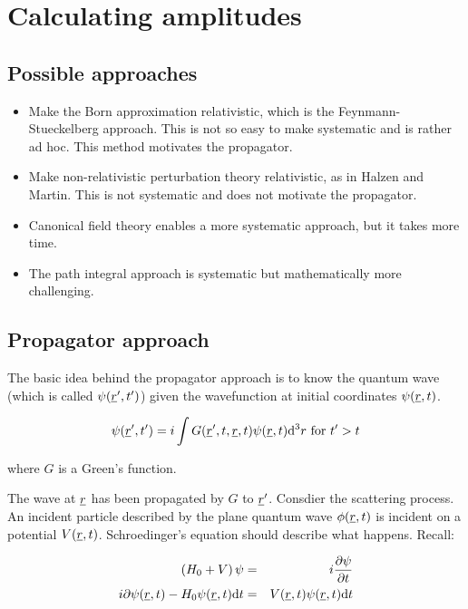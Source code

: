 \chapter{Calculating amplitudes}

\section{Possible approaches}

\begin{itemize}
  \item Make the Born approximation relativistic, which is the Feynmann-Stueckelberg approach.  This is not so easy to make systematic and is rather ad hoc.  This method motivates the propagator.
  \item Make non-relativistic perturbation theory relativistic, as in Halzen and Martin.  This is not systematic and does not motivate the propagator.
  \item Canonical field theory enables a more systematic approach, but it takes more time.
  \item The path integral approach is systematic but mathematically more challenging.
\end{itemize}

\section{Propagator approach}

The basic idea behind the propagator approach is to know the quantum wave (which is called $\psi(\underline{r}',t')$) given the wavefunction at initial coordinates $\psi(\underline{r},t)$.

\[
  \psi(\underline{r}',t') = i\int G(\underline{r}',t,\underline{r},t)\psi(\underline{r},t)\mathrm{d}^3r \textrm{ for } t' > t
\]

where $G$ is a Green's function.

The wave at $\underline{r}$ has been propagated by $G$ to $\underline{r}'$.  Consdier the scattering process.  An incident particle described by the plane quantum wave $\phi(\underline{r},t)$ is incident on a potential $V(\underline{r},t)$.  Schroedinger's equation should describe what happens.  Recall:

\begin{eqnarray*}
  \left(H_0 + V\right)\psi & = & i\frac{\partial \psi}{\partial t} \\
  i\partial\psi(\underline{r},t) - H_0\psi(\underline{r},t)\mathrm{d}t & = & V(\underline{r},t)\psi(\underline{r},t)\mathrm{d}t
\end{eqnarray*}

